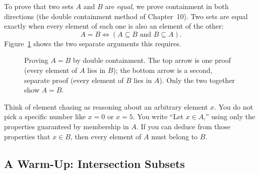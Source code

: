 To prove that two sets $A$ and $B$ are \emph{equal}, we prove containment in both directions (the double containment method of Chapter~10). Two sets are equal exactly when every element of each one is also an element of the other:
\[
A = B \iff (A \subseteq B \text{ and } B \subseteq A).
\]
Figure~\ref{11:fig-double-containment} shows the two separate arguments this requires.

\begin{figure}[htbp]
\centering
{}
\caption{Proving $A = B$ by double containment. The top arrow is one proof (every element of $A$ lies in $B$); the bottom arrow is a second, separate proof (every element of $B$ lies in $A$). Only the two together show $A = B$.}
\label{11:fig-double-containment}
\end{figure}

\begin{intuitionbox}
Think of element chasing as reasoning about an arbitrary element $x$. You do not pick a specific number like $x = 0$ or $x = 5$. You write ``Let $x \in A$,'' using only the properties guaranteed by membership in $A$. If you can deduce from those properties that $x \in B$, then every element of $A$ must belong to $B$.
\end{intuitionbox}

\subsection{A Warm-Up: Intersection Subsets}

